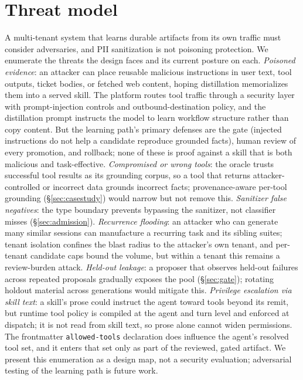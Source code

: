 \documentclass{article}
\newcommand{\code}[1]{\texttt{\small #1}}
\begin{document}
\section{Threat model}
\label{sec:threats}

A multi-tenant system that learns durable artifacts from its own traffic must consider adversaries, and PII sanitization is not poisoning protection. We enumerate the threats the design faces and its current posture on each. \emph{Poisoned evidence}: an attacker can place reusable malicious instructions in user text, tool outputs, ticket bodies, or fetched web content, hoping distillation memorializes them into a served skill. The platform routes tool traffic through a security layer with prompt-injection controls and outbound-destination policy, and the distillation prompt instructs the model to learn workflow structure rather than copy content. But the learning path's primary defenses are the gate (injected instructions do not help a candidate reproduce grounded facts), human review of every promotion, and rollback; none of these is proof against a skill that is both malicious and task-effective. \emph{Compromised or wrong tools}: the oracle trusts successful tool results as its grounding corpus, so a tool that returns attacker-controlled or incorrect data grounds incorrect facts; provenance-aware per-tool grounding (\S\ref{sec:casestudy}) would narrow but not remove this. \emph{Sanitizer false negatives}: the type boundary prevents bypassing the sanitizer, not classifier misses (\S\ref{sec:admission}). \emph{Recurrence flooding}: an attacker who can generate many similar sessions can manufacture a recurring task and its sibling suites; tenant isolation confines the blast radius to the attacker's own tenant, and per-tenant candidate caps bound the volume, but within a tenant this remains a review-burden attack. \emph{Held-out leakage}: a proposer that observes held-out failures across repeated proposals gradually exposes the pool (\S\ref{sec:gate}); rotating holdout material across generations would mitigate this. \emph{Privilege escalation via skill text}: a skill's prose could instruct the agent toward tools beyond its remit, but runtime tool policy is compiled at the agent and turn level and enforced at dispatch; it is not read from skill text, so prose alone cannot widen permissions. The frontmatter \code{allowed-tools} declaration does influence the agent's resolved tool set, and it enters that set only as part of the reviewed, gated artifact. We present this enumeration as a design map, not a security evaluation; adversarial testing of the learning path is future work.
\end{document}
